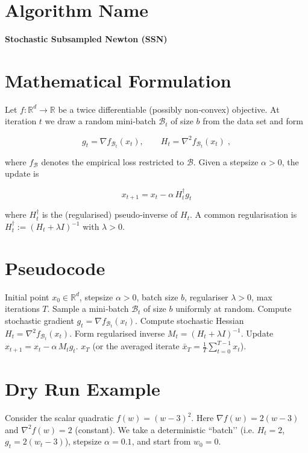 \documentclass{article}
\newcommand{\R}{\mathbb{R}}
\begin{document}
\section*{Algorithm Name}
\textbf{Stochastic Subsampled Newton (SSN)}  

\section*{Mathematical Formulation}
Let $f:\R^{d}\rightarrow\R$ be a twice differentiable (possibly non‑convex) objective.  
At iteration $t$ we draw a random mini‑batch $\mathcal{B}_{t}$ of size $b$ from the data set and form

\[
g_{t}= \nabla f_{\mathcal{B}_{t}}(x_{t}),\qquad
H_{t}= \nabla^{2} f_{\mathcal{B}_{t}}(x_{t})\;,
\]

where $f_{\mathcal{B}}$ denotes the empirical loss restricted to $\mathcal{B}$.  
Given a stepsize $\alpha>0$, the update is

\[
\boxed{\,x_{t+1}=x_{t}-\alpha\, H_{t}^{\dagger} g_{t}\,}\tag{1}
\]

where $H_{t}^{\dagger}$ is the (regularised) pseudo‑inverse of $H_{t}$.  
A common regularisation is $H_{t}^{\dagger}:=(H_{t}+\lambda I)^{-1}$ with $\lambda>0$.

\section*{Pseudocode}
\begin{algorithm}[H]
\caption{Stochastic Subsampled Newton (SSN)}
\begin{algorithmic}[1]
\Require Initial point $x_{0}\in\R^{d}$, stepsize $\alpha>0$, batch size $b$, regulariser $\lambda>0$, max iterations $T$.
    \State Sample a mini‑batch $\mathcal{B}_{t}$ of size $b$ uniformly at random.
    \State Compute stochastic gradient $g_{t}= \nabla f_{\mathcal{B}_{t}}(x_{t})$.
    \State Compute stochastic Hessian $H_{t}= \nabla^{2} f_{\mathcal{B}_{t}}(x_{t})$.
    \State Form regularised inverse $M_{t}= (H_{t}+\lambda I)^{-1}$.
    \State Update \; $x_{t+1}=x_{t}-\alpha\,M_{t} g_{t}$.
\EndFor
\State \Return $x_{T}$ (or the averaged iterate $\bar x_{T}=\frac1T\sum_{t=0}^{T-1}x_{t}$).
\end{algorithmic}
\end{algorithm}

\section*{Dry Run Example}
Consider the scalar quadratic $f(w)=(w-3)^{2}$.  
Here $\nabla f(w)=2(w-3)$ and $\nabla^{2}f(w)=2$ (constant).  
We take a deterministic “batch’’ (i.e. $H_{t}=2$, $g_{t}=2(w_{t}-3)$), stepsize $\alpha=0.1$, and start from $w_{0}=0$.
\end{document}
